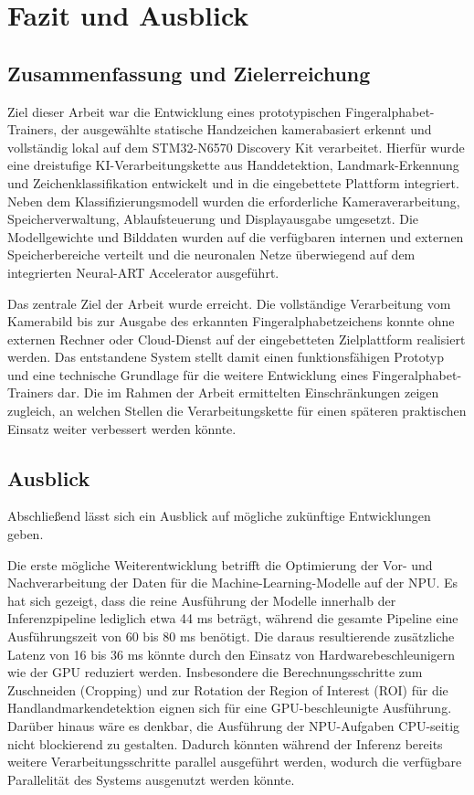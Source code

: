 \chapter{Fazit und Ausblick}\label{ch:fazit}
\section{Zusammenfassung und Zielerreichung}\label{sec:zusammenfassung}
Ziel dieser Arbeit war die Entwicklung eines prototypischen Fingeralphabet-Trainers, der ausgewählte statische Handzeichen kamerabasiert erkennt und vollständig lokal auf dem STM32-N6570 Discovery Kit verarbeitet. Hierfür wurde eine dreistufige KI-Verarbeitungskette aus Handdetektion, Landmark-Erkennung und Zeichenklassifikation entwickelt und in die eingebettete Plattform integriert. Neben dem Klassifizierungsmodell wurden die erforderliche Kameraverarbeitung, Speicherverwaltung, Ablaufsteuerung und Displayausgabe umgesetzt. Die Modellgewichte und Bilddaten wurden auf die verfügbaren internen und externen Speicherbereiche verteilt und die neuronalen Netze überwiegend auf dem integrierten Neural-ART Accelerator ausgeführt.

Das zentrale Ziel der Arbeit wurde erreicht. Die vollständige Verarbeitung vom Kamerabild bis zur Ausgabe des erkannten Fingeralphabetzeichens konnte ohne externen Rechner oder Cloud-Dienst auf der eingebetteten Zielplattform realisiert werden. Das entstandene System stellt damit einen funktionsfähigen Prototyp und eine technische Grundlage für die weitere Entwicklung eines Fingeralphabet-Trainers dar. Die im Rahmen der Arbeit ermittelten Einschränkungen zeigen zugleich, an welchen Stellen die Verarbeitungskette für einen späteren praktischen Einsatz weiter verbessert werden könnte.

\section{Ausblick}\label{sec:ausblick}
Abschließend lässt sich ein Ausblick auf mögliche zukünftige Entwicklungen geben.

Die erste mögliche Weiterentwicklung betrifft die Optimierung der Vor- und Nachverarbeitung der Daten für die Machine-Learning-Modelle auf der NPU. Es hat sich gezeigt, dass die reine Ausführung der Modelle innerhalb der Inferenzpipeline lediglich etwa 44 ms beträgt, während die gesamte Pipeline eine Ausführungszeit von 60 bis 80 ms benötigt. Die daraus resultierende zusätzliche Latenz von 16 bis 36 ms könnte durch den Einsatz von Hardwarebeschleunigern wie der GPU reduziert werden. Insbesondere die Berechnungsschritte zum Zuschneiden (Cropping) und zur Rotation der Region of Interest (ROI) für die Handlandmarkendetektion eignen sich für eine GPU-beschleunigte Ausführung. Darüber hinaus wäre es denkbar, die Ausführung der NPU-Aufgaben CPU-seitig nicht blockierend zu gestalten. Dadurch könnten während der Inferenz bereits weitere Verarbeitungsschritte parallel ausgeführt werden, wodurch die verfügbare Parallelität des Systems ausgenutzt werden könnte.

